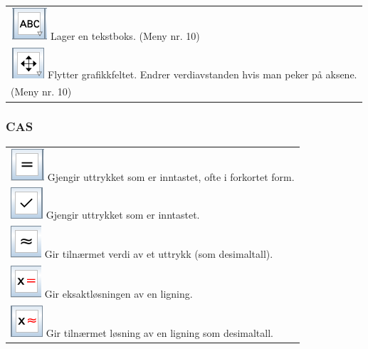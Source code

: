 \begin{tabular}{@{}l}
	\,\includegraphics[scale=0.4]{fig/tekst} Lager en tekstboks. (Meny nr. 10)\\		
	\,\includegraphics[scale=0.4]{fig/flytt} Flytter grafikkfeltet. Endrer verdiavstanden hvis man peker på aksene. \\
	\hspace{1cm}(Meny nr. 10)\\			
\end{tabular}
\subsubsection*{CAS}
\begin{tabular}{@{}l}
	\;\includegraphics[scale=0.4]{fig/erlik} Gjengir uttrykket som er inntastet, ofte i forkortet form.\\	
	\;\includegraphics[scale=0.4]{fig/brin} Gjengir uttrykket som er inntastet.\\	
	\;\includegraphics[scale=0.4]{fig/caerlik} Gir tilnærmet verdi av et uttrykk (som desimaltall). \\	
	\;\includegraphics[scale=0.4]{fig/x} Gir eksaktløsningen av en ligning.\\
	\;\includegraphics[scale=0.4]{fig/xca} Gir tilnærmet løsning av en ligning som desimaltall.\\
	
\end{tabular}

